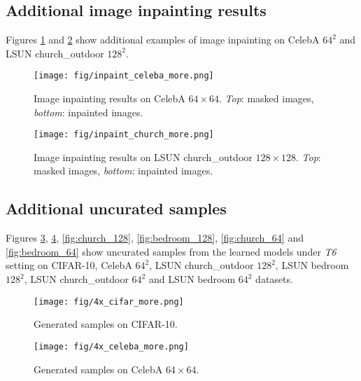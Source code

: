 \documentclass{article} \usepackage{iclr2021_conference,times}
\begin{document}
\subsection{Additional image inpainting results} \label{app:inpaint}
Figures \ref{fig: inpaint-celeba} and \ref{fig: inpaint-church} show additional examples of image inpainting on CelebA $64^2$ and LSUN church\_outdoor $128^2$. 

\begin{figure}[ht]
\begin{center}
\texttt{[image: fig/inpaint\_celeba\_more.png]} 
\end{center}
\caption{Image inpainting results on CelebA $64 \times 64$. {\em Top}: masked images, {\em bottom}: inpainted images.}
\label{fig: inpaint-celeba}
\end{figure}

\begin{figure}[ht]
\begin{center}
\texttt{[image: fig/inpaint\_church\_more.png]} 
\end{center}
\caption{Image inpainting results on LSUN church\_outdoor $128 \times 128$. {\em Top}: masked images, {\em bottom}: inpainted images.}
\label{fig: inpaint-church}
\end{figure}

\subsection{Additional uncurated samples} \label{app:samples}
Figures \ref{fig:cifar}, \ref{fig:celeba}, \ref{fig:church_128}, \ref{fig:bedroom_128}, \ref{fig:church_64} and \ref{fig:bedroom_64} show uncurated samples from the learned models under {\em T6} setting on CIFAR-10, CelebA $64^2$, LSUN church\_outdoor $128^2$, LSUN bedroom $128^2$, LSUN church\_outdoor $64^2$ and LSUN bedroom $64^2$ datasets. 


\begin{figure}[ht]
\begin{center}
\texttt{[image: fig/4x\_cifar\_more.png]}
\end{center}
\caption{Generated samples on CIFAR-10. }
\label{fig:cifar}
\end{figure}

\begin{figure}[ht]
\begin{center}
\texttt{[image: fig/4x\_celeba\_more.png]}
\end{center}
\caption{Generated samples on CelebA $64 \times 64$. }
\label{fig:celeba}
\end{figure}
\end{document}
